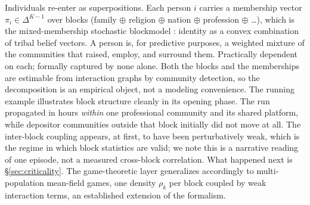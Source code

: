 \documentclass[11pt]{article}
\begin{document}
Individuals re-enter as superpositions. Each person $i$ carries a membership vector $\pi_i \in \Delta^{K-1}$ over blocks (family $\oplus$ religion $\oplus$ nation $\oplus$ profession $\oplus$ \dots), which is the mixed-membership stochastic blockmodel \cite{airoldi2008}: identity as a convex combination of tribal belief vectors. A person is, for predictive purposes, a weighted mixture of the communities that raised, employ, and surround them. Practically dependent on each; formally captured by none alone. Both the blocks and the memberships are estimable from interaction graphs by community detection, so the decomposition is an empirical object, not a modeling convenience. The running example illustrates block structure cleanly in its opening phase. The run propagated in hours \emph{within} one professional community and its shared platform, while depositor communities outside that block initially did not move at all. The inter-block coupling appears, at first, to have been perturbatively weak, which is the regime in which block statistics are valid; we note this is a narrative reading of one episode, not a measured cross-block correlation. What happened next is \S\ref{sec:criticality}. The game-theoretic layer generalizes accordingly to multi-population mean-field games, one density $\rho_k$ per block coupled by weak interaction terms, an established extension of the formalism.
\end{document}
